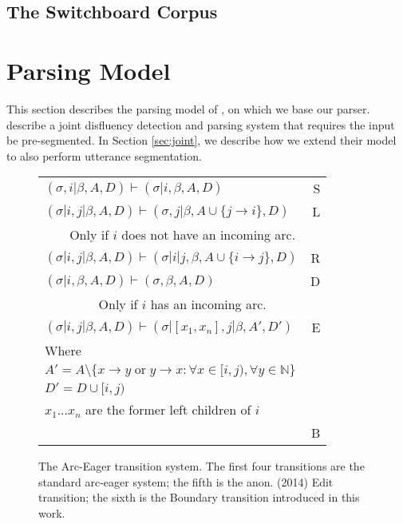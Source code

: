\documentclass[11pt,letterpaper]{article}
\begin{document}
\subsection{The Switchboard Corpus}

\section{Parsing Model}

This section describes the parsing model of \citet{honnibal:14}, on which we
base our parser. \citeauthor{honnibal:14} describe a joint disfluency detection
and parsing system that requires the input be pre-segmented.  In Section \ref{sec:joint},
we describe how we extend their model to also perform utterance segmentation.

\begin{figure}
    \centering
    \small
    \begin{tabular}{lr}
        $(\sigma,i | \beta, A, D) \vdash (\sigma | i, \beta, A, D) $ \hfill & \hfill S \\
        $(\sigma | i,j | \beta, A, D) \vdash ( \sigma, j | \beta, A \cup \{ j \rightarrow i \}, D ) $ \hfill & \hfill L \\
        \multicolumn{2}{c}{Only if $i$ does not have an incoming arc.}\\
        $(\sigma | i,j | \beta, A, D) \vdash ( \sigma | i | j, \beta, A \cup \{ i \rightarrow j \}, D ) $ \hfill & \hfill R \\
        $(\sigma | i, \beta, A, D) \vdash ( \sigma, \beta, A, D )$ \hfill & \hfill  D \\
        \multicolumn{2}{c}{Only if $i$ has an incoming arc.}\\
    \hline
    $(\sigma | i, j | \beta, A, D) \vdash (\sigma | [x_1, x_n], j | \beta,A',D')$ & E \\
    Where \\
    $A' = A \setminus \{x \rightarrow y\;\mathrm{or}\; y \rightarrow x : \forall x \in [i, j), \forall y \in \mathbb{N} \}$ \\
$D' = D \cup [i, j)$ \\
    $x_1...x_n$ are the former left children of $i$ \\
    \hline
    & B \\
    \end{tabular}
    \caption{\small The Arc-Eager transition system.  The first four transitions
        are the standard arc-eager system; the fifth is the anon. (2014) Edit
        transition; the sixth is the Boundary transition introduced
        in this work.\label{fig:ae_notation}}
\end{figure}
\end{document}
